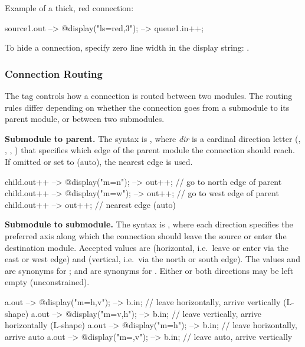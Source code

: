Example of a thick, red connection:
\begin{ned}
source1.out --> { @display("ls=red,3"); } --> queue1.in++;
\end{ned}

\begin{center}
\end{center}

\begin{note}
To hide a connection, specify zero line width in the display string:
.
\end{note}

\subsubsection{Connection Routing}
\label{sec:graphics:connection-routing}

The  tag controls how a connection is routed between two modules.
The routing rules differ depending on whether the connection goes from
a submodule to its parent module, or between two submodules.

\textbf{Submodule to parent.}
The syntax is , where \textit{dir} is a cardinal direction
letter (, , , ) that specifies which edge of
the parent module the connection should reach. If omitted or set to 
(auto), the nearest edge is used.

\begin{ned}
child.out++ --> { @display("m=n"); } --> out++;   // go to north edge of parent
child.out++ --> { @display("m=w"); } --> out++;   // go to west edge of parent
child.out++ --> out++;                            // nearest edge (auto)
\end{ned}

\textbf{Submodule to submodule.}
The syntax is , where each direction specifies
the preferred axis along which the connection should leave the source or enter
the destination module. Accepted values are  (horizontal, i.e.\ leave
or enter via the east or west edge) and  (vertical, i.e.\ via the
north or south edge). The values  and  are synonyms for
;  and  are synonyms for . Either or both
directions may be left empty (unconstrained).

\begin{ned}
a.out --> { @display("m=h,v"); } --> b.in;   // leave horizontally, arrive vertically (L-shape)
a.out --> { @display("m=v,h"); } --> b.in;   // leave vertically, arrive horizontally (L-shape)
a.out --> { @display("m=h"); } --> b.in;     // leave horizontally, arrive auto
a.out --> { @display("m=,v"); } --> b.in;    // leave auto, arrive vertically
\end{ned}

